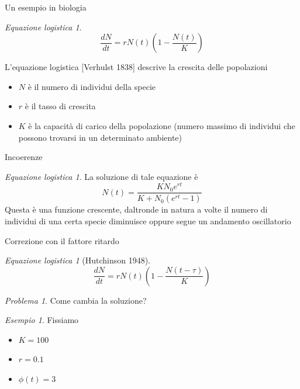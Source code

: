 \documentclass[intlimits]{beamer}
\numberwithin{equation}{section}
\theoremstyle{plain}
\theoremstyle{definition}
\theoremstyle{remark}
\newtheorem{esempio}[teor]{Esempio}
\newtheorem{prob}[teor]{Problema}
\newtheorem{eqlog}[teor]{Equazione logistica}
\begin{document}
\begin{frame}{Un esempio in biologia}
\pause

\begin{eqlog}

$$
\frac{d N}{d t} = r N(t) \left(1 - \frac{N(t)}{K} \right)
$$

\pause
L'equazione logistica [Verhulst 1838] descrive la crescita delle popolazioni 

\pause
\begin{itemize}[<+->]
 \item $N$ è il numero di individui della specie
 \item $r$ è il tasso di crescita
 \item $K$ è la capacità di carico della popolazione (numero massimo di individui 
	      che possono trovarsi in un determinato ambiente)
\end{itemize}

\end{eqlog}

\end{frame}


\begin{frame}{Incoerenze}

\pause
\begin{eqlog}
La soluzione di tale equazione è
$$
N(t)= \frac{K N_0 e^{rt}}{K+N_0(e^{rt}-1)}
$$
\pause
Questa è una funzione crescente, daltronde in natura a volte il numero di individui di una certa specie diminuisce oppure 
segue un andamento oscillatorio

\end{eqlog}

\end{frame}

\begin{frame}{Correzione con il fattore ritardo}

\pause

\begin{eqlog}[Hutchinson 1948]

$$
\frac{d N}{d t} = r N(t) \left(1 - \frac{N(t-\tau)}{K} \right)
$$

\end{eqlog}

\pause

\vspace{1cm}

\begin{prob}
 Come cambia la soluzione?
\end{prob}

\pause

\begin{esempio}
Fissiamo

\begin{itemize}
 \item $K=100$
 \item $r=0.1$
 \item $\phi(t)=3$
\end{itemize}

\end{esempio}

\end{frame}
\end{document}

